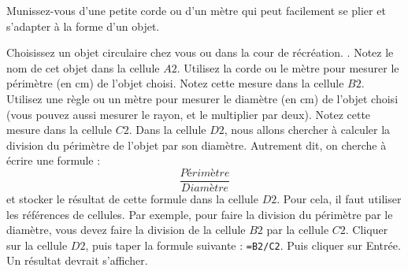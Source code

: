 \documentclass{exam}
\begin{document}
Munissez-vous d'une petite corde ou d'un mètre qui peut facilement se plier et s'adapter à la forme d'un objet.

\begin{questions}
  \question Choisissez un objet circulaire chez vous ou dans la cour de récréation. . Notez le nom de cet objet dans la cellule $A2$.
  \question Utilisez la corde ou le mètre pour mesurer le périmètre (en cm) de l'objet choisi. Notez cette mesure dans la cellule $B2$.
  \question Utilisez une règle ou un mètre pour mesurer le diamètre (en cm) de l'objet choisi (vous pouvez aussi mesurer le rayon, et le multiplier par deux).  Notez cette mesure dans la cellule $C2$.
  \question Dans la cellule $D2$, nous allons chercher à calculer la division du périmètre de l'objet par son diamètre. Autrement dit, on cherche à écrire une formule : 
  \[
  \frac{Périmètre}{Diamètre}
  \]
  et stocker le résultat de cette formule dans la cellule $D2$. Pour cela, il faut utiliser les références de cellules. Par exemple, pour faire la division du périmètre par le diamètre, vous devez faire la division de la cellule $B2$ par la cellule $C2$. Cliquer sur la cellule $D2$, puis taper la formule suivante : \verb|=B2/C2|. Puis cliquer sur Entrée. Un résultat devrait s'afficher.


\end{questions}
\end{document}
